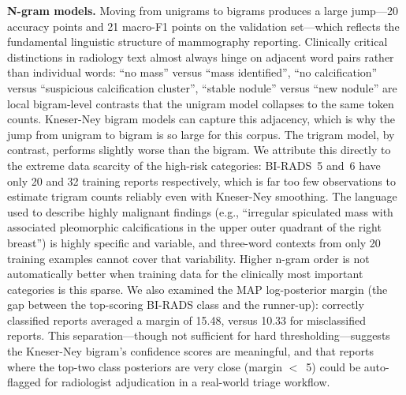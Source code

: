 \documentclass[11pt,a4paper]{article}
\begin{document}
\textbf{N-gram models.}
Moving from unigrams to bigrams produces a large jump---20 accuracy points and
21 macro-F1 points on the validation set---which reflects the fundamental
linguistic structure of mammography reporting.
Clinically critical distinctions in radiology text almost always hinge on
adjacent word pairs rather than individual words: ``no mass'' versus ``mass
identified'', ``no calcification'' versus ``suspicious calcification cluster'',
``stable nodule'' versus ``new nodule'' are local bigram-level contrasts that
the unigram model collapses to the same token counts.
Kneser-Ney bigram models can capture this adjacency, which is why the jump
from unigram to bigram is so large for this corpus.
The trigram model, by contrast, performs slightly worse than the bigram.
We attribute this directly to the extreme data scarcity of the high-risk
categories: BI-RADS~5 and~6 have only 20 and 32 training reports respectively,
which is far too few observations to estimate trigram counts reliably even
with Kneser-Ney smoothing.
The language used to describe highly malignant findings (e.g., ``irregular
spiculated mass with associated pleomorphic calcifications in the upper outer
quadrant of the right breast'') is highly specific and variable, and
three-word contexts from only 20 training examples cannot cover that
variability.
Higher n-gram order is not automatically better when training data for the
clinically most important categories is this sparse.
We also examined the MAP log-posterior margin (the gap between the top-scoring
BI-RADS class and the runner-up): correctly classified reports averaged a
margin of 15.48, versus 10.33 for misclassified reports.
This separation---though not sufficient for hard thresholding---suggests the
Kneser-Ney bigram's confidence scores are meaningful, and that reports where
the top-two class posteriors are very close (margin $<$~5) could be
auto-flagged for radiologist adjudication in a real-world triage workflow.
\end{document}

